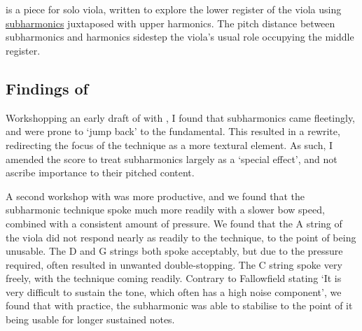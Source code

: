\section{\violaPiece}\label{sec:violaPiece}
\hyperref[app:violaPiece Score]{\violaPiece} is a piece for solo viola, written to explore the lower register of the viola using \hyperref[sec:subharmonicsDiscussion]{subharmonics} juxtaposed with upper harmonics. 
The pitch distance between subharmonics and harmonics sidestep the viola's usual role occupying the middle register.



\subsection{Findings of \violaPiece}

Workshopping an early draft of \violaPiece\space with \violaParticipant, I found that subharmonics came fleetingly, and were prone to `jump back' to the fundamental.\autocite[]{appleseedFeedbackExploratorySession2019}
This resulted in a rewrite, redirecting the focus of the technique as a more textural element. 
As such, I amended the score to treat subharmonics largely as a `special effect', and not ascribe importance to their pitched content.

A second workshop with \violaParticipant\space was more productive, and we found that the subharmonic technique spoke much more readily with a slower bow speed, combined with a consistent amount of pressure.\autocite[]{appleseedFeedbackSightreadingSession2019}
We found that the A string of the viola did not respond nearly as readily to the technique, to the point of being unusable.
The D and G strings both spoke acceptably, but due to the pressure required, often resulted in unwanted double-stopping.
The C string spoke very freely, with the technique coming readily.
Contrary to Fallowfield stating `It is very difficult to sustain the tone, which often has a high noise component', we found that with practice, the subharmonic was able to stabilise to the point of it being usable for longer sustained notes.\autocites[http://www.cellomap.com/index/the-string/plucking-striking-and-bowing-the-string/how.html]{fallowfieldCelloMapHandbook2009}[]{fallowfieldCelloMapExample2013}[]{appleseedFeedbackSightreadingSession2019}

